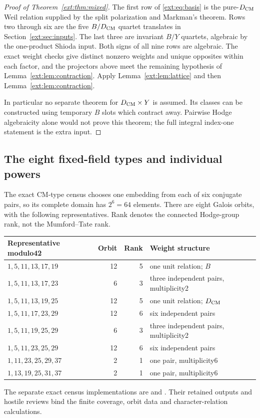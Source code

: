 \begin{proof}[Proof of Theorem~\ref{ext:thm:mixed}]
The first row of \eqref{ext:eq:basis} is the pure-${D_{\mathrm{CM}}}$ Weil relation supplied
by the split polarization and Markman's theorem. Rows two through six
are the five $B/{D_{\mathrm{CM}}}$ quartet translates in Section~\ref{ext:sec:inputs}.
The last three are invariant $B/Y$ quartets, algebraic by the one-product
Shioda input. Both signs of all nine rows are algebraic. The exact weight
checks give distinct nonzero weights and unique opposites within each
factor, and the projectors above meet the remaining hypothesis of
Lemma~\ref{ext:lem:contraction}. Apply Lemma~\ref{ext:lem:lattice} and then
Lemma~\ref{ext:lem:contraction}.

In particular no separate theorem for ${D_{\mathrm{CM}}}\times Y$ is assumed. Its
classes can be constructed using temporary $B$ slots which contract
away. Pairwise Hodge algebraicity alone would not prove this theorem;
the full integral index-one statement is the extra input.
\end{proof}

\subsection{The eight fixed-field types and individual powers}
The exact CM-type census chooses one embedding from each of six conjugate
pairs, so its complete domain has $2^6=64$ elements. There are eight
Galois orbits, with the following representatives. Rank denotes the
connected Hodge-group rank, not the Mumford--Tate rank.
\begin{center}
\small
\begin{tabular}{@{}lrrl@{}}
\toprule
Representative modulo42 & Orbit & Rank & Weight structure\\
\midrule
$1,5,11,13,17,19$ &12&5&one unit relation; $B$\\
$1,5,11,13,17,23$ &6&3&three independent pairs, multiplicity2\\
$1,5,11,13,19,25$ &12&5&one unit relation; ${D_{\mathrm{CM}}}$\\
$1,5,11,17,23,29$ &12&6&six independent pairs\\
$1,5,11,19,25,29$ &6&3&three independent pairs, multiplicity2\\
$1,5,11,23,25,29$ &12&6&six independent pairs\\
$1,11,23,25,29,37$ &2&1&one pair, multiplicity6\\
$1,13,19,25,31,37$ &2&1&one pair, multiplicity6\\
\bottomrule
\end{tabular}
\end{center}
The separate exact census implementations are
 and
.
Their retained outputs and hostile reviews bind the finite coverage,
orbit data and character-relation calculations.

